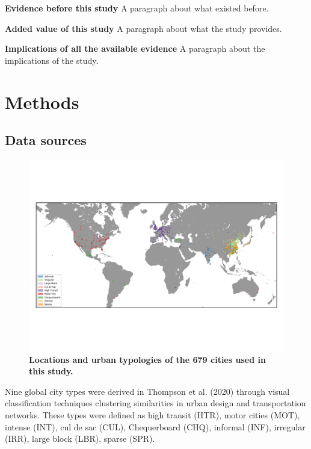 \documentclass[preprint,12pt]{elsarticle}
\begin{document}
\textbf{Evidence before this study} 
A paragraph about what existed before.

\textbf{Added value of this study} 
A paragraph about what the study provides.

\textbf{Implications of all the available evidence} 
A paragraph about the implications of the study.



\section*{Methods}

\subsection*{Data sources}


\begin{figure}
\centering
\includegraphics[trim={13 78 13 78},clip,scale=0.9]{Images/WorldPollutionClusters.png}
\caption{\bf Locations and urban typologies of the 679 cities used in this study.}
 \label{fig:clusters}
\end{figure}




Nine global city types were derived in Thompson et al. (2020) \cite{Thompson2020} through visual classification techniques clustering similarities in urban design and transportation networks. These types were defined as high transit (HTR), motor cities (MOT), intense (INT), cul de sac (CUL), Chequerboard (CHQ), informal (INF), irregular (IRR), large block (LBR), sparse (SPR). 
\end{document}

